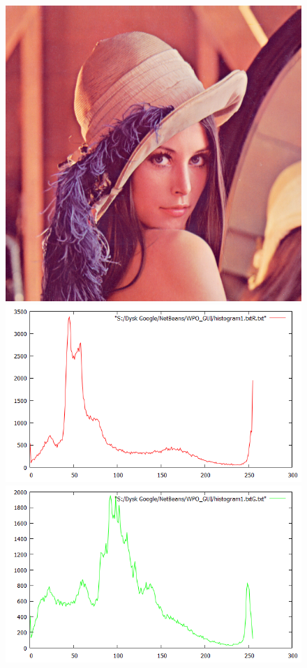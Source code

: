 \documentclass{article}
\begin{document}
  \begin{figure}[!ht]	
	\centering	
	\includegraphics[scale=2]{img/histogram/obliczanie-rgb}
	\includegraphics[scale=0.3]{img/histogram/obliczanie-r}
  \includegraphics[scale=0.3]{img/histogram/obliczanie-g}

\end{figure}
\end{document}
